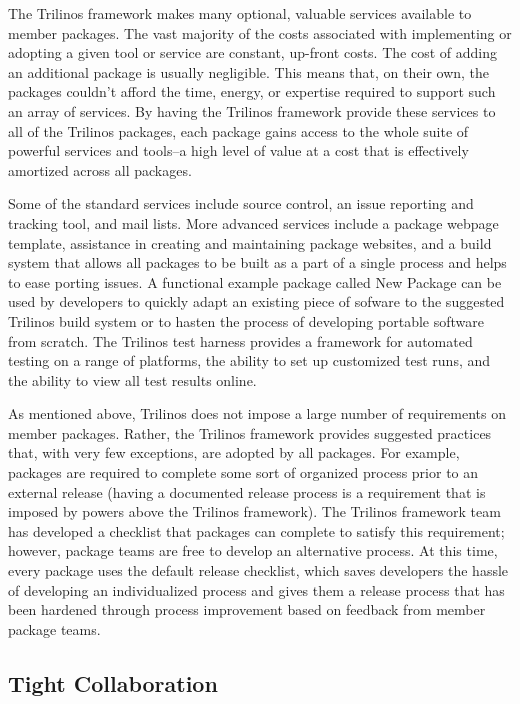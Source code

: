 \documentclass[12pt,relax]{article}
\begin{document}
The Trilinos framework makes many optional, valuable services available to
member packages.  The vast majority of the costs associated with implementing
or adopting a given tool or service are constant, up-front costs.  The cost of
adding an additional package is usually negligible.  This means that, on their
own, the packages couldn't afford the time, energy, or expertise required to
support such an array of services.  By having the Trilinos framework
provide these services to all of the Trilinos packages, each package gains
access to the whole suite of powerful services and tools--a high level of value
at a cost that is effectively amortized across all packages.

Some of the standard services include source control, an issue reporting and
tracking tool, and mail lists.  More advanced services include a package
webpage template, assistance in creating and maintaining package websites, and
a build system that allows all packages to be built as a part of a single
process and helps to ease porting issues.  A functional example package called
New Package can be used by developers to quickly adapt an existing piece of
sofware to the suggested Trilinos build system or to hasten the process of
developing portable software from scratch.  The Trilinos test harness provides
a framework for automated testing on a range of platforms, the ability to set
up customized test runs, and the ability to view all test results online.

As mentioned above, Trilinos does not impose a large number of requirements
on member packages.  Rather, the Trilinos framework provides suggested 
practices that, with very few exceptions, are adopted by all packages.
For example, packages are required to complete some sort of organized
process prior to an external release (having a documented release
process is a requirement that is imposed by powers above the Trilinos
framework).  The Trilinos framework team has developed a checklist that
packages can complete to satisfy this requirement; however, package teams
are free to develop an alternative process.  At this time, every package
uses the default release checklist, which saves developers the hassle of
developing an individualized process and gives them a release process that
has been hardened through process improvement based on feedback from
member package teams.

\subsection{Tight Collaboration}
\end{document}
